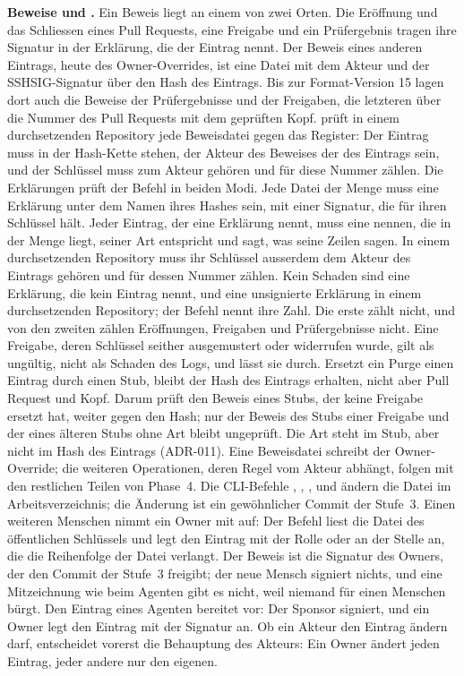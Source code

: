 {\bf Beweise und .}
Ein Beweis liegt an einem von zwei Orten.
Die Eröffnung und das Schliessen eines Pull Requests, eine Freigabe und ein Prüfergebnis tragen
ihre Signatur in der Erklärung, die der Eintrag nennt.
Der Beweis eines anderen Eintrags, heute des Owner-Overrides, ist eine Datei
 mit dem Akteur und der SSHSIG-Signatur über den Hash des Eintrags.
Bis zur Format-Version 15 lagen dort auch die Beweise der Prüfergebnisse und der Freigaben,
die letzteren über die Nummer des Pull Requests mit dem geprüften Kopf.
 prüft in einem durchsetzenden Repository jede Beweisdatei gegen das Register:
Der Eintrag muss in der Hash-Kette stehen, der Akteur des Beweises der des Eintrags sein,
und der Schlüssel muss zum Akteur gehören und für diese Nummer zählen.
Die Erklärungen prüft der Befehl in beiden Modi.
Jede Datei der Menge muss eine Erklärung unter dem Namen ihres Hashes sein, mit einer Signatur,
die für ihren Schlüssel hält.
Jeder Eintrag, der eine Erklärung nennt, muss eine nennen, die in der Menge liegt, seiner Art
entspricht und sagt, was seine Zeilen sagen.
In einem durchsetzenden Repository muss ihr Schlüssel ausserdem dem Akteur des Eintrags gehören
und für dessen Nummer zählen.
Kein Schaden sind eine Erklärung, die kein Eintrag nennt, und eine unsignierte Erklärung in einem
durchsetzenden Repository; der Befehl nennt ihre Zahl.
Die erste zählt nicht, und von den zweiten zählen Eröffnungen, Freigaben und Prüfergebnisse
nicht.
Eine Freigabe, deren Schlüssel seither ausgemustert oder widerrufen wurde, gilt als ungültig,
nicht als Schaden des
Logs, und  lässt sie durch.
Ersetzt ein Purge einen Eintrag durch einen Stub, bleibt der Hash des Eintrags erhalten,
nicht aber Pull Request und Kopf.
Darum prüft  den Beweis eines Stubs, der keine Freigabe ersetzt hat, weiter
gegen den Hash;
nur der Beweis des Stubs einer Freigabe und der eines älteren Stubs ohne Art
bleibt ungeprüft.
Die Art steht im Stub, aber nicht im Hash des Eintrags (ADR-011).
Eine Beweisdatei schreibt der Owner-Override;
die weiteren Operationen, deren Regel vom Akteur abhängt, folgen mit den restlichen Teilen von
Phase~4.
Die CLI-Befehle , , ,
 und  ändern die Datei im Arbeitsverzeichnis;
die Änderung ist ein gewöhnlicher Commit der Stufe~3.
Einen weiteren Menschen nimmt ein Owner mit  auf:
Der Befehl liest die Datei des öffentlichen Schlüssels und legt den Eintrag mit der Rolle
 oder  an der Stelle an, die die Reihenfolge der Datei verlangt.
Der Beweis ist die Signatur des Owners, der den Commit der Stufe~3 freigibt;
der neue Mensch signiert nichts, und eine Mitzeichnung wie beim Agenten gibt es nicht,
weil niemand für einen Menschen bürgt.
Den Eintrag eines Agenten bereitet  vor: Der Sponsor signiert, und ein Owner
legt den Eintrag mit der Signatur an.
Ob ein Akteur den Eintrag ändern darf, entscheidet vorerst die Behauptung des Akteurs:
Ein Owner ändert jeden Eintrag, jeder andere nur den eigenen.

